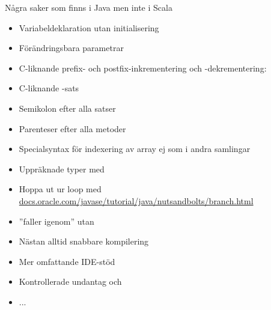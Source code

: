 \begin{Slide}{Några saker som finns i Java men inte i Scala}\SlideFontSmall
\vspace{-0.7em}\begin{multicols}{2}
\begin{itemize}
\item Variabeldeklaration utan initialisering

\item Förändringsbara parametrar

\item C-liknande prefix- och postfix-inkrementering och -dekrementering: 

\item C-liknande -sats

\item Semikolon efter alla satser

\item Parenteser efter alla metoder

\item Specialsyntax för indexering av array \code{[]} ej som i andra samlingar

\item Uppräknade typer med {\texttt{\bfseries{\color{eclipsepurple}{enum}}}}

\item Hoppa ut ur loop med  \\ \href{https://docs.oracle.com/javase/tutorial/java/nutsandbolts/branch.html}{docs.oracle.com/javase/tutorial/java/nutsandbolts/branch.html}

\item {} ''faller igenom'' utan 

\item Nästan alltid snabbare kompilering

\item Mer omfattande IDE-stöd

\item Kontrollerade undantag  och 

\item ...
\end{itemize}

\end{multicols}
\end{Slide}





